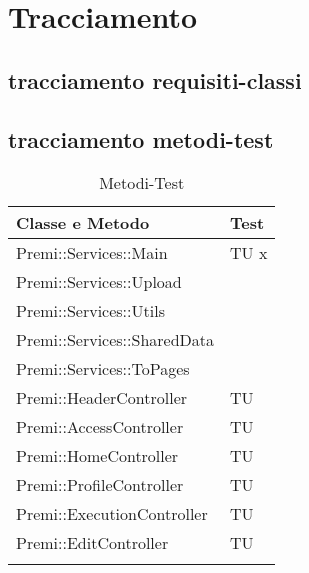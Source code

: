 \section{Tracciamento}
\subsection{tracciamento requisiti-classi}
\subsection{tracciamento metodi-test}
\begin{center}
\bgroup
\def\arraystretch{1.5}
\begin{longtable}{ | p{12cm} | p{2cm} | }
\hline
\cellcolor[gray]{0.9} \textbf{Classe e Metodo} & \cellcolor[gray]{0.9} \textbf{Test}
 \\ \hline
Premi::Services::Main & TU x \\ \hline 
Premi::Services::Upload & \\ \hline
Premi::Services::Utils  & \\ \hline
Premi::Services::SharedData & \\ \hline
Premi::Services::ToPages & \\ \hline
Premi::HeaderController & TU \\ \hline
Premi::AccessController & TU \\ \hline
Premi::HomeController & TU \\ \hline
Premi::ProfileController & TU \\ \hline
Premi::ExecutionController & TU \\ \hline
Premi::EditController & TU \\ \hline

\caption{Metodi-Test}
\end{longtable}
\egroup
\end{center}